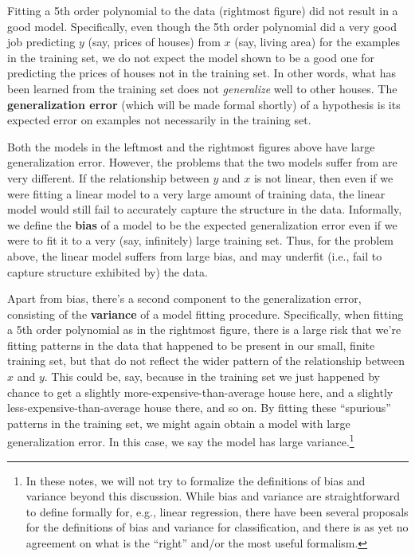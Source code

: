 \documentclass{article} %
\begin{document}
Fitting a 5th order polynomial to the data (rightmost figure) did not result in a good
model.  Specifically, even though the 5th order polynomial did a very good job
predicting $y$ (say, prices of houses) from $x$ (say, living area) for the examples
in the training set, we do not expect the model shown to be a good one for predicting
the prices of houses not in the training set.  In other words, what has been
learned from the training set does not \emph{generalize} well to other houses.
The {\bf generalization error} (which will be made formal shortly)
of a hypothesis is its expected error on examples not necessarily in the
training set.

Both the models in the leftmost and the rightmost figures above have large
generalization error.  However, the problems that the two models suffer from
are very different.  If the relationship between $y$ and $x$ is not linear,
then even if we were fitting a linear model to a very large amount of training
data, the linear model would still fail to accurately capture the structure
in the data.  Informally, we define the {\bf bias} of a model to be the
expected generalization error even if we were to fit it to a very (say,
infinitely) large training set.  Thus, for the problem above, the linear
model suffers from large bias, and may underfit (i.e., fail to capture
structure exhibited by) the data.

Apart from bias, there's a second component to the generalization error,
consisting of the {\bf variance} of a model fitting procedure.  Specifically,
when fitting a 5th order polynomial as in the rightmost figure, there is a
large risk that we're fitting patterns in the data that happened to be
present in our small, finite training set, but that do not reflect the
wider pattern of the relationship between $x$ and $y$.   This could be,
say, because in the
training set we just happened by chance to get a slightly more-expensive-than-average
house here, and a slightly less-expensive-than-average house there, and so on.
By fitting these ``spurious'' patterns in the training set, we might again
obtain a model with large generalization error.  In this case, we say the
model has large variance.\footnote{In these notes, we will not try to
formalize the definitions of bias and variance beyond this discussion.
While bias and variance
are straightforward to define formally for, e.g., linear regression,
there have been several proposals for the definitions of bias and
variance for classification, and there is as yet no agreement on what is
the ``right'' and/or the most useful formalism.}
\end{document}

